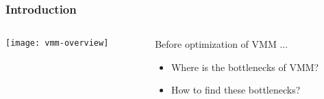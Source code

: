 %
%
\begin{frame}[plain]
	\frametitle{Introduction}
	
	
	
	\begin{columns}
		
		\begin{column}{.4\textwidth}
			
			\texttt{[image: vmm-overview]}
			
		\end{column}
		
		\begin{column}{.6\textwidth}
			
		\Large
		Before optimization of VMM ...
		\begin{itemize}
			\item Where is the bottlenecks of VMM?
			\item How to find these bottlenecks?
			
		\end{itemize} 	
			


		\end{column}
		
		
	\end{columns}
	
	
\end{frame}

